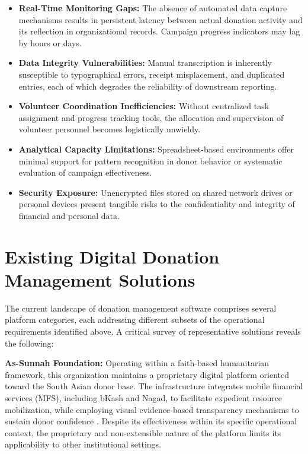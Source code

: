 \documentclass{thesis-library}
\begin{document}
\begin{itemize}
    \item \textbf{Real-Time Monitoring Gaps:} The absence of automated data capture mechanisms results in persistent latency between actual donation activity and its reflection in organizational records. Campaign progress indicators may lag by hours or days.
    \item \textbf{Data Integrity Vulnerabilities:} Manual transcription is inherently susceptible to typographical errors, receipt misplacement, and duplicated entries, each of which degrades the reliability of downstream reporting.
    \item \textbf{Volunteer Coordination Inefficiencies:} Without centralized task assignment and progress tracking tools, the allocation and supervision of volunteer personnel becomes logistically unwieldy.
    \item \textbf{Analytical Capacity Limitations:} Spreadsheet-based environments offer minimal support for pattern recognition in donor behavior or systematic evaluation of campaign effectiveness.
    \item \textbf{Security Exposure:} Unencrypted files stored on shared network drives or personal devices present tangible risks to the confidentiality and integrity of financial and personal data.
\end{itemize}

\setlength{\parindent}{0pt}

\section{Existing Digital Donation Management Solutions}

The current landscape of donation management software comprises several platform categories, each addressing different subsets of the operational requirements identified above. A critical survey of representative solutions reveals the following:

\textbf{As-Sunnah Foundation:} Operating within a faith-based humanitarian framework, this organization maintains a proprietary digital platform oriented toward the South Asian donor base. The infrastructure integrates mobile financial services (MFS), including bKash and Nagad, to facilitate expedient resource mobilization, while employing visual evidence-based transparency mechanisms to sustain donor confidence \cite{assunnah2025digital}. Despite its effectiveness within its specific operational context, the proprietary and non-extensible nature of the platform limits its applicability to other institutional settings.
\end{document}
